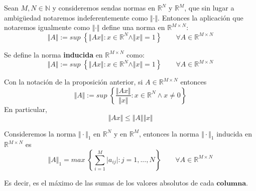 \begin{nprop}
Sean $M, N \in \mathbb{N}$ y consideremos sendas normas en $\mathbb{R}^N$ y $\mathbb{R}^M$, que sin lugar a ambigüedad notaremos indeferentemente como $\Vert \cdot \Vert$. Entonces la aplicación que notaremos igualmente como $\Vert \cdot \Vert$ define una norma en $\mathbb{R}^{M \times N}$:
\[ \Vert A \Vert := sup \; \left\lbrace \Vert Ax \Vert : x \in \mathbb{R}^N \wedge \Vert x \Vert = 1 \right\rbrace \qquad \forall A \in \mathbb{R}^{M \times N} \]
\end{nprop}

\begin{ndef}
Se define la norma \textbf{inducida} en $\mathbb{R}^{M \times N}$ como:
\[ \Vert A \Vert := sup \; \left\lbrace \Vert Ax \Vert : x \in \mathbb{R}^N \wedge \Vert x \Vert = 1 \right\rbrace \qquad \forall A \in \mathbb{R}^{M \times N} \]
\end{ndef}

\begin{nprop}
Con la notación de la proposición anterior, si $A \in \mathbb{R}^{M \times N}$ entonces
\[ \Vert A \Vert := sup \; \left\lbrace \frac{\Vert Ax \Vert}{\Vert x \Vert } : x \in \mathbb{R}^N \wedge x \neq 0 \right\rbrace \]
En particular,
\[ \Vert Ax \Vert \leq \Vert A \Vert \Vert x \Vert \]
\end{nprop}

\begin{nprop}
Consideremos la norma $\Vert \cdot \Vert _1$ en $\mathbb{R}^N$ y en $\mathbb{R}^M$, entonces la norma $\Vert \cdot \Vert _1$ inducida en $\mathbb{R}^{M \times N}$ es
\[ \Vert A \Vert _1 = max \; \left\lbrace \sum_{i=1}^M \vert a_{ij} \vert : j = 1,...,N \right\rbrace \qquad \forall A \in \mathbb{R}^{M \times N} \]
\end{nprop}

Es decir, es el máximo de las sumas de los valores absolutos de cada $\textbf{columna}$.

